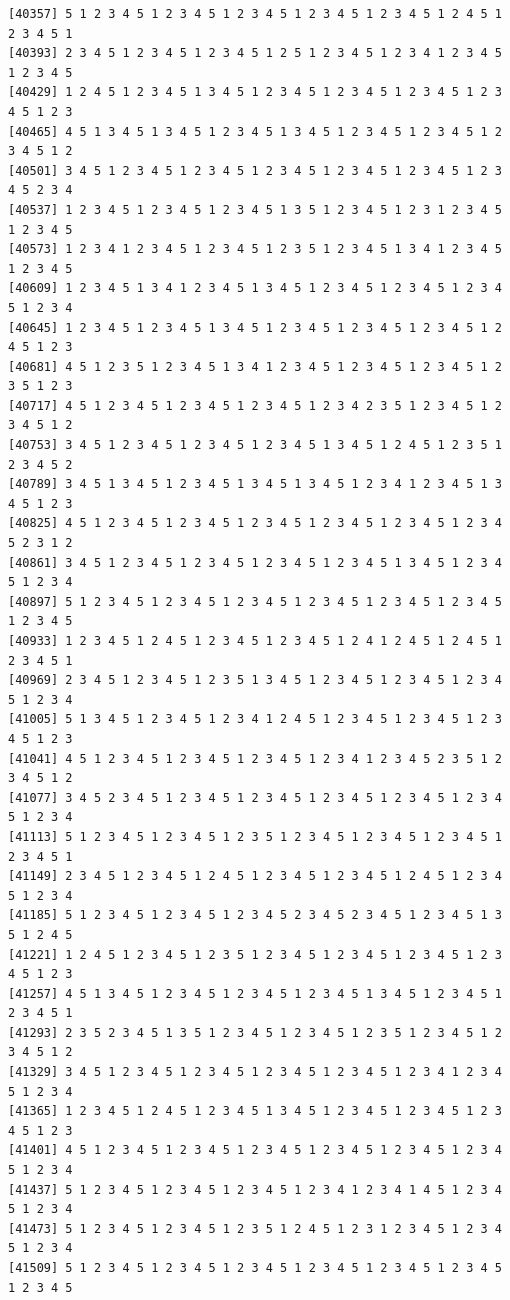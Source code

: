 \documentclass[
  11pt,
]{book}
\begin{document}
\begin{verbatim}
[40357] 5 1 2 3 4 5 1 2 3 4 5 1 2 3 4 5 1 2 3 4 5 1 2 3 4 5 1 2 4 5 1 2 3 4 5 1
[40393] 2 3 4 5 1 2 3 4 5 1 2 3 4 5 1 2 5 1 2 3 4 5 1 2 3 4 1 2 3 4 5 1 2 3 4 5
[40429] 1 2 4 5 1 2 3 4 5 1 3 4 5 1 2 3 4 5 1 2 3 4 5 1 2 3 4 5 1 2 3 4 5 1 2 3
[40465] 4 5 1 3 4 5 1 3 4 5 1 2 3 4 5 1 3 4 5 1 2 3 4 5 1 2 3 4 5 1 2 3 4 5 1 2
[40501] 3 4 5 1 2 3 4 5 1 2 3 4 5 1 2 3 4 5 1 2 3 4 5 1 2 3 4 5 1 2 3 4 5 2 3 4
[40537] 1 2 3 4 5 1 2 3 4 5 1 2 3 4 5 1 3 5 1 2 3 4 5 1 2 3 1 2 3 4 5 1 2 3 4 5
[40573] 1 2 3 4 1 2 3 4 5 1 2 3 4 5 1 2 3 5 1 2 3 4 5 1 3 4 1 2 3 4 5 1 2 3 4 5
[40609] 1 2 3 4 5 1 3 4 1 2 3 4 5 1 3 4 5 1 2 3 4 5 1 2 3 4 5 1 2 3 4 5 1 2 3 4
[40645] 1 2 3 4 5 1 2 3 4 5 1 3 4 5 1 2 3 4 5 1 2 3 4 5 1 2 3 4 5 1 2 4 5 1 2 3
[40681] 4 5 1 2 3 5 1 2 3 4 5 1 3 4 1 2 3 4 5 1 2 3 4 5 1 2 3 4 5 1 2 3 5 1 2 3
[40717] 4 5 1 2 3 4 5 1 2 3 4 5 1 2 3 4 5 1 2 3 4 2 3 5 1 2 3 4 5 1 2 3 4 5 1 2
[40753] 3 4 5 1 2 3 4 5 1 2 3 4 5 1 2 3 4 5 1 3 4 5 1 2 4 5 1 2 3 5 1 2 3 4 5 2
[40789] 3 4 5 1 3 4 5 1 2 3 4 5 1 3 4 5 1 3 4 5 1 2 3 4 1 2 3 4 5 1 3 4 5 1 2 3
[40825] 4 5 1 2 3 4 5 1 2 3 4 5 1 2 3 4 5 1 2 3 4 5 1 2 3 4 5 1 2 3 4 5 2 3 1 2
[40861] 3 4 5 1 2 3 4 5 1 2 3 4 5 1 2 3 4 5 1 2 3 4 5 1 3 4 5 1 2 3 4 5 1 2 3 4
[40897] 5 1 2 3 4 5 1 2 3 4 5 1 2 3 4 5 1 2 3 4 5 1 2 3 4 5 1 2 3 4 5 1 2 3 4 5
[40933] 1 2 3 4 5 1 2 4 5 1 2 3 4 5 1 2 3 4 5 1 2 4 1 2 4 5 1 2 4 5 1 2 3 4 5 1
[40969] 2 3 4 5 1 2 3 4 5 1 2 3 5 1 3 4 5 1 2 3 4 5 1 2 3 4 5 1 2 3 4 5 1 2 3 4
[41005] 5 1 3 4 5 1 2 3 4 5 1 2 3 4 1 2 4 5 1 2 3 4 5 1 2 3 4 5 1 2 3 4 5 1 2 3
[41041] 4 5 1 2 3 4 5 1 2 3 4 5 1 2 3 4 5 1 2 3 4 1 2 3 4 5 2 3 5 1 2 3 4 5 1 2
[41077] 3 4 5 2 3 4 5 1 2 3 4 5 1 2 3 4 5 1 2 3 4 5 1 2 3 4 5 1 2 3 4 5 1 2 3 4
[41113] 5 1 2 3 4 5 1 2 3 4 5 1 2 3 5 1 2 3 4 5 1 2 3 4 5 1 2 3 4 5 1 2 3 4 5 1
[41149] 2 3 4 5 1 2 3 4 5 1 2 4 5 1 2 3 4 5 1 2 3 4 5 1 2 4 5 1 2 3 4 5 1 2 3 4
[41185] 5 1 2 3 4 5 1 2 3 4 5 1 2 3 4 5 2 3 4 5 2 3 4 5 1 2 3 4 5 1 3 5 1 2 4 5
[41221] 1 2 4 5 1 2 3 4 5 1 2 3 5 1 2 3 4 5 1 2 3 4 5 1 2 3 4 5 1 2 3 4 5 1 2 3
[41257] 4 5 1 3 4 5 1 2 3 4 5 1 2 3 4 5 1 2 3 4 5 1 3 4 5 1 2 3 4 5 1 2 3 4 5 1
[41293] 2 3 5 2 3 4 5 1 3 5 1 2 3 4 5 1 2 3 4 5 1 2 3 5 1 2 3 4 5 1 2 3 4 5 1 2
[41329] 3 4 5 1 2 3 4 5 1 2 3 4 5 1 2 3 4 5 1 2 3 4 5 1 2 3 4 1 2 3 4 5 1 2 3 4
[41365] 1 2 3 4 5 1 2 4 5 1 2 3 4 5 1 3 4 5 1 2 3 4 5 1 2 3 4 5 1 2 3 4 5 1 2 3
[41401] 4 5 1 2 3 4 5 1 2 3 4 5 1 2 3 4 5 1 2 3 4 5 1 2 3 4 5 1 2 3 4 5 1 2 3 4
[41437] 5 1 2 3 4 5 1 2 3 4 5 1 2 3 4 5 1 2 3 4 1 2 3 4 1 4 5 1 2 3 4 5 1 2 3 4
[41473] 5 1 2 3 4 5 1 2 3 4 5 1 2 3 5 1 2 4 5 1 2 3 1 2 3 4 5 1 2 3 4 5 1 2 3 4
[41509] 5 1 2 3 4 5 1 2 3 4 5 1 2 3 4 5 1 2 3 4 5 1 2 3 4 5 1 2 3 4 5 1 2 3 4 5

\end{verbatim}
\end{document}
